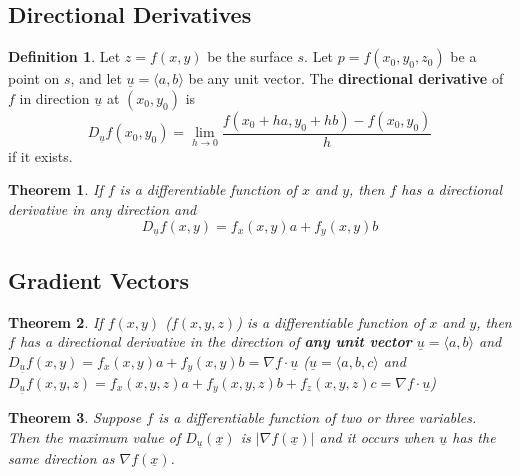 \documentclass[12 pt]{article}
\newtheorem{thm}{Theorem}
\theoremstyle{definition}
\newtheorem{defn}{Definition}
\begin{document}
\subsection{Directional Derivatives}
\begin{defn}
  Let $z=f(x,y)$ be the surface $s$. Let $p=f(x_0,y_0,z_0)$ be a point on $s$, and let $\underline{u}=\langle a, b \rangle $ be any unit vector. The \textbf{directional derivative} of $f$ in direction $\underline{u}$ at $(x_0,y_0)$ is
  $$D_{\underline{u}}f(x_0,y_0)=\lim_{h \to 0}\frac{f(x_0+ha,y_0+hb)-f(x_0,y_0)}{h}$$ if it exists.

\end{defn}
\begin{thm}
  If $f$ is a differentiable function of $x$ and $y$, then $f$ has a directional derivative in any direction and
  $$ D_{\underline{u}}f(x,y)=f_x(x,y)a+f_y(x,y)b$$
\end{thm}
\subsection{Gradient Vectors}
\begin{thm}
  If ${f(x,y)}$ ($f(x,y,z)$) is a differentiable function of $x$ and $y$, then $f$ has a directional derivative in the direction of \textbf{any unit vector} $\underline{u}=\langle a, b \rangle$ and $D_{\underline{u}}f(x,y)=f_x(x,y)a+f_y(x,y)b=\nabla f \cdot \underline{u}$ ($\underline{u}=\langle a, b, c \rangle$ and $D_{\underline{u}}f(x,y,z)=f_x(x,y,z)a+f_y(x,y,z)b+f_z(x,y,z)c = \nabla f \cdot \underline{u}$)
\end{thm}
\begin{thm}
  Suppose $f$ is a differentiable function of two or three variables. Then the maximum value of $D_{\underline{u}}(\underline{x})$ is $|\nabla f(\underline{x})|$ and it occurs when $\underline{u}$ has the same direction as $\nabla f(\underline{x})$.
\end{thm}
\end{document}
